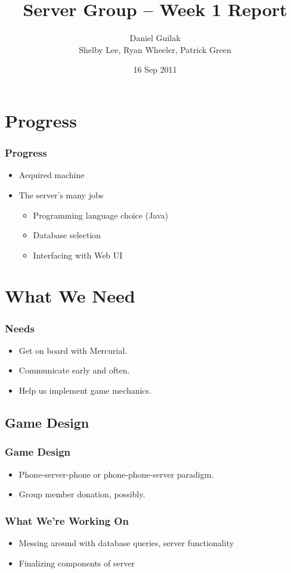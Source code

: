 \documentclass{beamer}
\title[]{Server Group -- Week 1 Report}
\author{Daniel Guilak \\ Shelby Lee, Ryan Wheeler, Patrick Green}
\institute{Vir Pong}
\date{16 Sep 2011}
\begin{document}
\begin{frame}
\titlepage
\end{frame}

\section{Progress}
\begin{frame}
\frametitle{Progress}
	\begin{itemize}[<+->]
		\item Acquired machine
		\item The server's many jobs
		\begin{itemize}
			\item Programming language choice (Java)
			\item Database selection
			\item Interfacing with Web UI 
		\end{itemize}
	\end{itemize}
\end{frame}

\section{What We Need}
\begin{frame}[Needs]
	\frametitle{Needs}
	\begin{itemize}[<+->]
		\item Get on board with Mercurial.
		\item Communicate early and often.
		\item Help us implement game mechanics.
	\end{itemize}
\end{frame}

\subsection{Game Design}
\begin{frame}
\frametitle{Game Design}
	\begin{itemize}[<+->]
		\item Phone-server-phone or phone-phone-server paradigm.
		\item Group member donation, possibly.
	\end{itemize}
\end{frame}

\begin{frame}
\frametitle{What We're Working On}
\begin{itemize}[<+->]
	\item Messing around with database queries, server functionality
	\item Finalizing components of server
\end{itemize}
\end{frame}
\end{document}
